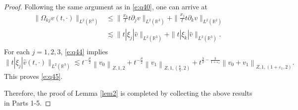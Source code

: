 \documentclass[10pt,a4paper]{amsart}
\newcommand{\R}{\mathbb R}
\newcommand{\f}{\frac}
\newcommand{\p}{\partial}
\begin{document}
\begin{proof}
Following the same argument as in \eqref{e:q40}, one can arrive at
\begin{equation}\label{e:q46''}
\begin{aligned}
\|\Omega_{kj}v(t, \cdot)\|_{L^2(\R^3)}&\leq \|\f{x_k}{t}t\p_jv\|_{L^2(\R^3)}+\|\f{x_j}{t}t\p_kv\|_{L^2(\R^2)}\\
& \lesssim \|t|\xi_j|\hat{v}\|_{L^2(\R^3)}+\|t|\xi_k|\hat{v}\|_{L^2(\R^3)}.\\
\end{aligned}
\end{equation}
For each $j=1,2,3$, \eqref{e:q44} implies
$$
\|t|\xi_j|\hat{v}(t, \cdot)\|_{L^2(\R^3)} \lesssim t^{-\f{\mu}{2}}\left\|v_0\right\|_{Z, 1, 2}+t^{-\f{\mu}{2}}\left\|v_1\right\|_{Z, 1,(\f65, 2)}+t^{\f32-\f{3}{1+\varepsilon_1}}\left\|v_0+v_1\right\|_{Z, 1,(1+\varepsilon_1, 2)}.
$$
This proves \eqref{e:q45}.

Therefore, the proof of Lemma \ref{lem2} is completed by collecting the above results in Parts 1-5.
\end{proof}
\end{document}
